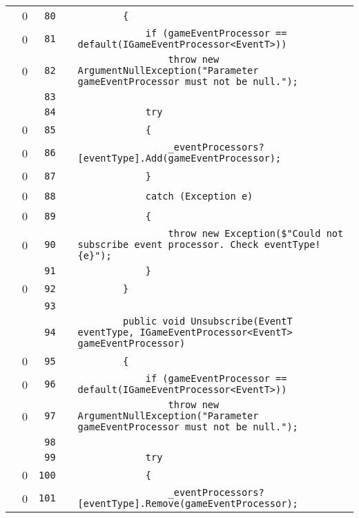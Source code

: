 \documentclass[a4paper,landscape,10pt]{article}
\begin{document}
\begin{longtable}[l]{lrrll}
\cellcolor{red} & 0 & \verb~80~ & & \verb~        {~\\
\cellcolor{red} & 0 & \verb~81~ & & \verb~            if (gameEventProcessor == default(IGameEventProcessor<EventT>))~\\
\cellcolor{red} & 0 & \verb~82~ & & \verb~                throw new ArgumentNullException("Parameter gameEventProcessor must not be null.");~\\
\cellcolor{gray} &  & \verb~83~ & & \verb~~\\
\cellcolor{gray} &  & \verb~84~ & & \verb~            try~\\
\cellcolor{red} & 0 & \verb~85~ & & \verb~            {~\\
\cellcolor{red} & 0 & \verb~86~ & & \verb~                _eventProcessors?[eventType].Add(gameEventProcessor);~\\
\cellcolor{red} & 0 & \verb~87~ & & \verb~            }~\\
\cellcolor{red} & 0 & \verb~88~ & & \verb~            catch (Exception e)~\\
\cellcolor{red} & 0 & \verb~89~ & & \verb~            {~\\
\cellcolor{red} & 0 & \verb~90~ & & \verb~                throw new Exception($"Could not subscribe event processor. Check eventType! {e}");~\\
\cellcolor{gray} &  & \verb~91~ & & \verb~            }~\\
\cellcolor{red} & 0 & \verb~92~ & & \verb~        }~\\
\cellcolor{gray} &  & \verb~93~ & & \verb~~\\
\cellcolor{gray} &  & \verb~94~ & & \verb~        public void Unsubscribe(EventT eventType, IGameEventProcessor<EventT> gameEventProcessor)~\\
\cellcolor{red} & 0 & \verb~95~ & & \verb~        {~\\
\cellcolor{red} & 0 & \verb~96~ & & \verb~            if (gameEventProcessor == default(IGameEventProcessor<EventT>))~\\
\cellcolor{red} & 0 & \verb~97~ & & \verb~                throw new ArgumentNullException("Parameter gameEventProcessor must not be null.");~\\
\cellcolor{gray} &  & \verb~98~ & & \verb~~\\
\cellcolor{gray} &  & \verb~99~ & & \verb~            try~\\
\cellcolor{red} & 0 & \verb~100~ & & \verb~            {~\\
\cellcolor{red} & 0 & \verb~101~ & & \verb~                _eventProcessors?[eventType].Remove(gameEventProcessor);~\\

\end{longtable}
\end{document}
